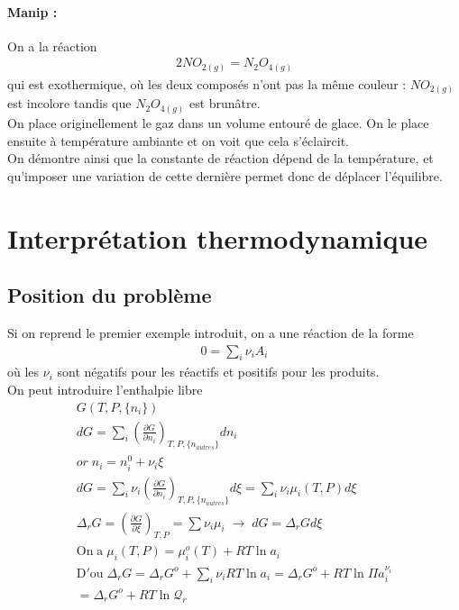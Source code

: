 \documentclass[12pt,prb,aps,epsf]{article}
\begin{document}
\paragraph{Manip :} On a la réaction
\begin{eqnarray}
2NO_{2(g)} = N_2O_{4(g)}
\end{eqnarray}
qui est exothermique, où les deux composés n'ont pas la même couleur : $NO_{2(g)}$ est incolore tandis que $N_2O_{4(g)}$ est brunâtre.\\
On place originellement le gaz dans un volume entouré de glace. On le place ensuite à température ambiante et on voit que cela s'éclaircit.\\
On démontre ainsi que la constante de réaction dépend de la température, et qu'imposer une variation de cette dernière permet donc de déplacer l'équilibre.

\section{Interprétation thermodynamique}
\subsection{Position du problème}
Si on reprend le premier exemple introduit, on a une réaction de la forme 
\begin{eqnarray}
0 = \sum _i \nu_i A_i
\end{eqnarray}
où les $\nu_i$ sont négatifs pour les réactifs et positifs pour les produits.\\
On peut introduire l'enthalpie libre 
\begin{eqnarray}
G(T,P,\{n_i\})\\
dG = \sum_i \left(\frac{\partial G}{\partial n_i}\right)_{T,P,\{n_{autres}\}}dn_i\\
or\; n_i = n_{i}^0 + \nu_i \xi\\
dG = \sum_i \nu_i \left(\frac{\partial G}{\partial n_i}\right)_{T,P,\{n_{autres}\}}d\xi = \sum_i \nu_i \mu_i(T,P)d\xi\\
\Delta_rG = \left(\frac{\partial G}{\partial \xi}\right)_{T,P} = \sum \nu_i\mu_i \;\rightarrow \;dG = \Delta_rG d\xi\\
\mathrm{On\;a}\;\mu_i(T,P) = \mu_i^o(T)  +RT\ln a_i\\
\mathrm{D'ou}\; \Delta _rG = \Delta _rG^o + \sum_i \nu_i RT\ln a_i = \Delta _rG^o + RT \ln \Pi a_i^{\nu_i}\\
= \Delta_rG^o + RT \ln\mathcal{Q}_r
\end{eqnarray}
\end{document}
